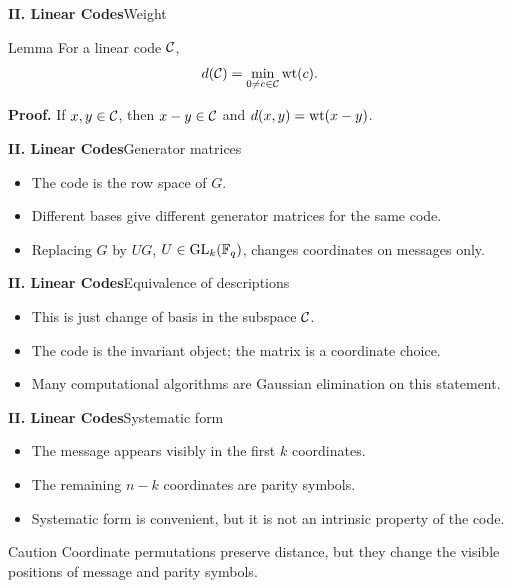 \begin{frame}{\textbf{II. Linear Codes}}{Weight}
\small
{}
\begin{block}{Lemma}
For a linear code $\mathcal{C}$,
\[
  d(\mathcal{C})=\min_{0\ne c\in\mathcal{C}}\operatorname{wt}(c).
\]
\end{block}
\textbf{Proof.} If $x,y\in\mathcal{C}$, then $x-y\in\mathcal{C}$ and $d(x,y)=\operatorname{wt}(x-y)$.
\end{frame}

\begin{frame}{\textbf{II. Linear Codes}}{Generator matrices}
\small
{}
\begin{itemize}
  \item The code is the row space of $G$.
  \item Different bases give different generator matrices for the same code.
  \item Replacing $G$ by $UG$, $U\in\operatorname{GL}_k(\mathbb{F}_q)$, changes coordinates on messages only.
\end{itemize}
\end{frame}

\begin{frame}{\textbf{II. Linear Codes}}{Equivalence of descriptions}
\small
{}
\begin{itemize}
  \item This is just change of basis in the subspace $\mathcal{C}$.
  \item The code is the invariant object; the matrix is a coordinate choice.
  \item Many computational algorithms are Gaussian elimination on this statement.
\end{itemize}
\end{frame}

\begin{frame}{\textbf{II. Linear Codes}}{Systematic form}
\small
{}
\begin{itemize}
  \item The message appears visibly in the first $k$ coordinates.
  \item The remaining $n-k$ coordinates are parity symbols.
  \item Systematic form is convenient, but it is not an intrinsic property of the code.
\end{itemize}
\begin{block}{Caution}
Coordinate permutations preserve distance, but they change the visible positions of message and parity symbols.
\end{block}
\end{frame}

